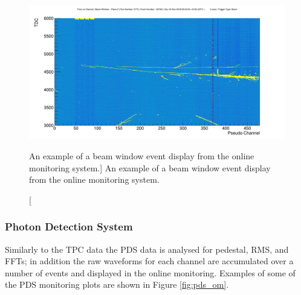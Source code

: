 \begin{figure}

	\centering

	\includegraphics[width=\textwidth]{figures/beam_evd.png}

	\caption
	[An example of a beam window event display from the \protodune{} online
	monitoring system.]
	{An example of a beam window event display from the \protodune{} online
	monitoring system.}

	\label{fig:beam_evd}

\end{figure}

\subsubsection*{Photon Detection System}
Similarly to the TPC data the PDS data is analysed for pedestal, RMS, and FFTs;
in addition the raw waveforms for each channel are accumulated over a number of
events and displayed in the online monitoring. Examples of some of the PDS 
monitoring plots are shown in Figure \ref{fig:pds_om}.

